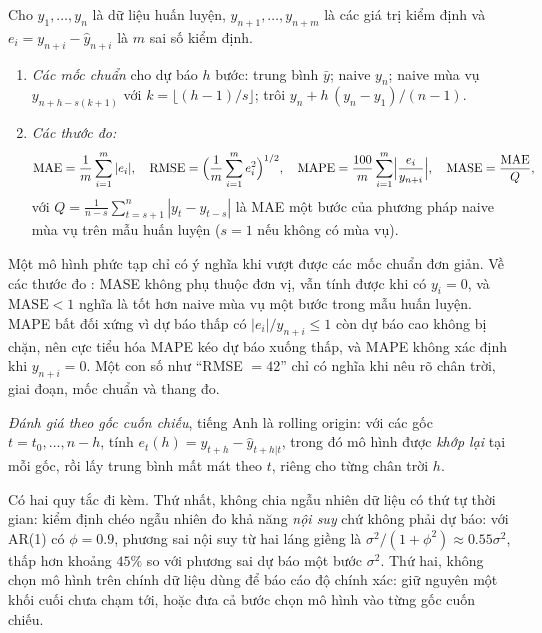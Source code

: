 Cho $y_1,\dots,y_n$ là dữ liệu huấn luyện, $y_{n+1},\dots,y_{n+m}$ là các giá trị kiểm định và $e_i=y_{n+i}-\hat y_{n+i}$ là $m$ sai số kiểm định.
\begin{kq}
\begin{enumerate}[label=(\roman*),leftmargin=*,itemsep=1pt]
\item \emph{Các mốc chuẩn} cho dự báo $h$ bước: trung bình $\bar y$; naive $y_n$; naive mùa vụ $y_{n+h-s(k+1)}$ với $k=\lfloor(h-1)/s\rfloor$; trôi $y_n+h\,(y_n-y_1)/(n-1)$.
\item \emph{Các thước đo:}
\[
\mathrm{MAE}=\frac1m\sum_{i=1}^{m}|e_i|,\quad
\mathrm{RMSE}=\Bigl(\frac1m\sum_{i=1}^{m}e_i^2\Bigr)^{1/2},\quad
\mathrm{MAPE}=\frac{100}{m}\sum_{i=1}^{m}\Bigl|\frac{e_i}{y_{n+i}}\Bigr|,\quad
\mathrm{MASE}=\frac{\mathrm{MAE}}{Q},
\]
với $Q=\frac1{n-s}\sum_{t=s+1}^{n}|y_t-y_{t-s}|$ là MAE một bước của phương pháp naive mùa vụ trên mẫu huấn luyện ($s=1$ nếu không có mùa vụ).
\end{enumerate}
\end{kq}
Một mô hình phức tạp chỉ có ý nghĩa khi vượt được các mốc chuẩn đơn giản. Về các thước đo : MASE không phụ thuộc đơn vị, vẫn tính được khi có $y_i=0$, và $\mathrm{MASE}<1$ nghĩa là tốt hơn naive mùa vụ một bước trong mẫu huấn luyện. MAPE bất đối xứng vì dự báo thấp có $|e_i|/y_{n+i}\le1$ còn dự báo cao không bị chặn, nên cực tiểu hóa MAPE kéo dự báo xuống thấp, và MAPE không xác định khi $y_{n+i}=0$. Một con số như ``RMSE $=42$'' chỉ có nghĩa khi nêu rõ chân trời, giai đoạn, mốc chuẩn và thang đo.

\begin{kq}
\emph{Đánh giá theo gốc cuốn chiếu}, tiếng Anh là rolling origin: với các gốc $t=t_0,\dots,n-h$, tính $e_t(h)=y_{t+h}-\hat y_{t+h|t}$, trong đó mô hình được \emph{khớp lại} tại mỗi gốc, rồi lấy trung bình mất mát theo $t$, riêng cho từng chân trời $h$.
\end{kq}
Có hai quy tắc đi kèm. Thứ nhất, không chia ngẫu nhiên dữ liệu có thứ tự thời gian: kiểm định chéo ngẫu nhiên đo khả năng \emph{nội suy} chứ không phải dự báo: với AR(1) có $\phi=0.9$, phương sai nội suy từ hai láng giềng là $\sigma^2/(1+\phi^2)\approx0.55\sigma^2$, thấp hơn khoảng $45\%$ so với phương sai dự báo một bước $\sigma^2$. Thứ hai, không chọn mô hình trên chính dữ liệu dùng để báo cáo độ chính xác: giữ nguyên một khối cuối chưa chạm tới, hoặc đưa cả bước chọn mô hình vào từng gốc cuốn chiếu.

